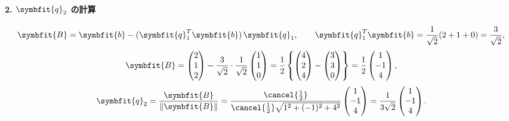     \paragraph{2. $\symbfit{q}_2$ の計算}
    \[
        \symbfit{B} = \symbfit{b} - (\symbfit{q}_1^T \symbfit{b})\,\symbfit{q}_1,
        \qquad
        \symbfit{q}_1^T \symbfit{b} = \frac{1}{\sqrt2}(2+1+0)=\frac{3}{\sqrt2},
    \]
    \[
    \symbfit{B}
        = \begin{pmatrix}2\\1\\2\end{pmatrix}
         - \frac{3}{\sqrt2}\cdot\frac{1}{\sqrt2}
        \begin{pmatrix}1\\1\\0\end{pmatrix}
        =\frac{1}{2}\left\{
        \begin{pmatrix} 4 \\ 2 \\ 4 \end{pmatrix}
        - \begin{pmatrix} 3 \\ 3 \\ 0 \end{pmatrix}\right\}
        =\frac{1}{2}
        \begin{pmatrix} 1 \\ -1 \\ 4 \end{pmatrix},
    \]
    \[
    \symbfit{q}_2 = \frac{\symbfit{B}}{\|\symbfit{B}\|}
        = \frac{\cancel{\frac{1}{2}}}{\cancel{\frac{1}{2}}\sqrt{1^2+(-1)^2+4^2}}
        \begin{pmatrix}1 \\ -1 \\ 4\end{pmatrix}
        = \frac{1}{3\sqrt{2}}
        \begin{pmatrix}1\\-1\\4\end{pmatrix}.
    \]

